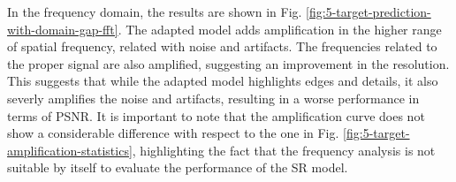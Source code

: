         In the frequency domain, the results  are shown in Fig. \ref{fig:5-target-prediction-with-domain-gap-fft}.  
        The adapted model adds amplification in the higher range of spatial frequency, related with noise and artifacts. The frequencies related to the proper signal are also amplified, suggesting an improvement in the resolution.
        This suggests that while the adapted model highlights edges and details, it also severly amplifies the noise and artifacts, resulting in a worse performance in terms of PSNR.
        It is important to note that the amplification curve does not show a considerable difference with respect to the one in Fig. \ref{fig:5-target-amplification-statistics},
        highlighting the fact that the frequency analysis is not suitable by itself to evaluate the performance of the SR model.

